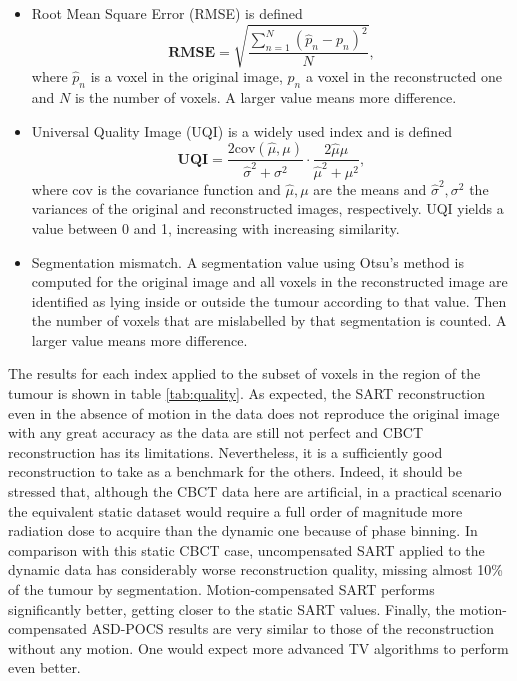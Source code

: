 \begin{itemize}

\item Root Mean Square Error (RMSE) is defined
\begin{equation}
\boldsymbol{\textrm{RMSE}}=\sqrt{\frac{\sum_{n=1}^N(\hat{p}_n-p_n)^2}{N}},
\end{equation}
where $\hat{p}_n$ is a voxel in the original image, $p_n$ a voxel in the reconstructed one and $N$ is the number of voxels.  A larger value means more difference.

\item Universal Quality Image (UQI)\cite{wang2002universal} is a widely used index and is defined
\begin{equation}
\boldsymbol{\textrm{UQI}}=\frac{2\textrm{cov}(\hat{\mu},\mu)}{\hat{\sigma}^2+\sigma^2}\cdot \frac{2\hat{\mu}\mu}{\hat{\mu}^2+\mu^2},
\end{equation}
where $\textrm{cov}$ is the covariance function and $\hat{\mu},\mu$ are the means and $\hat{\sigma}^2,\sigma^2$ the variances of the original and reconstructed images, respectively.  UQI yields a value between 0 and 1, increasing with increasing similarity.

\item Segmentation mismatch.  A segmentation value using Otsu's method\cite{otsu1975threshold} is computed for the original image and all voxels in the reconstructed image are identified as lying inside or outside the tumour according to that value.  Then the number of voxels that are mislabelled by that segmentation is counted.  A larger value means more difference.

\end{itemize}

The results for each index applied to the subset of voxels in the region of the tumour is shown in table \ref{tab:quality}.  As expected, the SART reconstruction even in the absence of motion in the data does not reproduce the original image with any great accuracy as the data are still not perfect and CBCT reconstruction has its limitations.  Nevertheless, it is a sufficiently good reconstruction to take as a benchmark for the others.  Indeed, it should be stressed that, although the CBCT data here are artificial, in a practical scenario the equivalent static dataset would require a full order of magnitude more radiation dose to acquire than the dynamic one because of phase binning.  In comparison with this static CBCT case, uncompensated SART applied to the dynamic data has considerably worse reconstruction quality, missing almost 10\% of the tumour by segmentation.  Motion-compensated SART performs significantly better, getting closer to the static SART values.  Finally, the motion-compensated ASD-POCS results are very similar to those of the reconstruction without any motion.  One would expect more advanced TV algorithms to perform even better.
  
